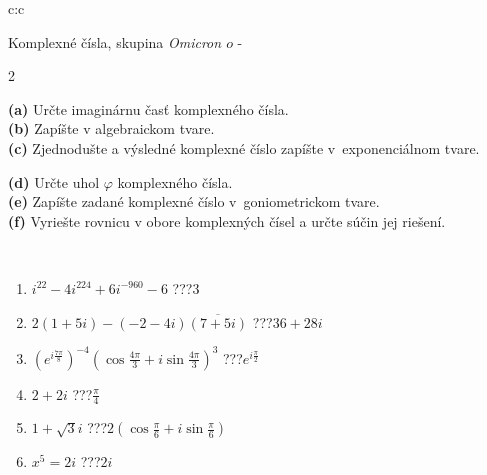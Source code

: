 \documentclass[10pt]{report}
\newcommand\omicron{o}
\begin{document}
\begin{tabular}{c:c}
\begin{minipage}[c][104.5mm][t]{0.5\linewidth}
\begin{center}
\vspace{7mm}
{\huge Komplexné čísla, skupina \textit{Omicron $\omicron$} -}\\[5mm]
\begin{minipage}{0.95\linewidth}
\begin{center}
{\small \begin{multicols}{2} \raggedright
\textbf{(a)} Určte imaginárnu časť komplexného čísla. \\[1mm]
\textbf{(b)} Zapíšte v algebraickom tvare. \\[1mm]
\textbf{(c)} Zjednodušte a výsledné komplexné číslo zapíšte v~exponenciálnom tvare. \par \columnbreak
\textbf{(d)} Určte uhol \(\varphi\) komplexného čísla. \\[1mm]
\textbf{(e)} Zapíšte zadané komplexné číslo v~goniometrickom tvare. \\[1mm]
\textbf{(f)} Vyriešte rovnicu v obore komplexných čísel a určte súčin jej riešení.
\end{multicols}
}
\end{center}
\end{minipage}
\\[4mm]
\begin{minipage}{0.79\linewidth}
\begin{center}
\begin{varwidth}{\linewidth}
\begin{enumerate}
\large
\item $i^{22}-4i^{224}+6i^{-960}-6$\quad \dotfill\; ???\;\dotfill \quad $3$
\item $2(1+5i)-(-2-4i)\overline{(7+5i)}$\quad \dotfill\; ???\;\dotfill \quad $36+28i$
\item $\left(e^{i\frac{7\pi}{8}}\right)^{-4}\left(\cos{\frac{4\pi}{3}}+i\sin{\frac{4\pi}{3}}\right)^{3}$\quad \dotfill\; ???\;\dotfill \quad $e^{i\frac{\pi}{2}}$
\item $2+2i$\quad \dotfill\; ???\;\dotfill \quad $\frac{\pi}{4}$
\item $1+\sqrt{3}i$\quad \dotfill\; ???\;\dotfill \quad $2\left(\cos{\frac{\pi}{6}}+i\sin{\frac{\pi}{6}}\right)$
\item $x^5=2i$\quad \dotfill\; ???\;\dotfill \quad $2i$
\end{enumerate}
\end{varwidth}

\end{center}
\end{minipage}
\end{center}
\end{minipage}
\end{tabular}
\end{document}
